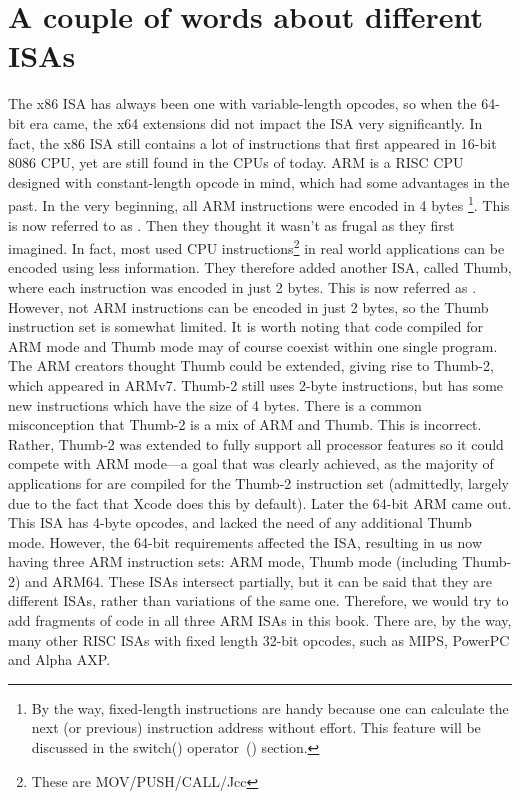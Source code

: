 \ifx\LITE\undefined
{}%
%
%

\section{A couple of words about different \ac{ISA}s}
The x86 \ac{ISA} has always been one with variable-length opcodes, so when the 64-bit era came, the x64 extensions did not impact the \ac{ISA} very significantly. In fact, the x86 \ac{ISA} still contains a lot of instructions that first appeared in 16-bit 8086 CPU, yet are still found in the CPUs of today.
ARM is a \ac{RISC} \ac{CPU} designed with constant-length opcode in mind, which had some advantages in the past.
In the very beginning, all ARM instructions were encoded in 4 bytes%
\footnote{
By the way, fixed-length instructions are handy because one can calculate the next (or previous) 
instruction address without effort. This feature will be discussed in the switch() operator~() section.
}.
This is now referred to as .
Then they thought it wasn't as frugal as they first imagined.
In fact, most used \ac{CPU} instructions\footnote{These are MOV/PUSH/CALL/Jcc} in real world applications can be encoded using less information.
They therefore added another \ac{ISA}, called Thumb, where each instruction was encoded in just 2 bytes.
This is now referred as .
However, not  ARM instructions can be encoded in just 2 bytes, so the Thumb instruction set is somewhat limited.
It is worth noting that code compiled for ARM mode and Thumb mode may of course coexist within one single program.
The ARM creators thought Thumb could be extended, giving rise to Thumb-2, which appeared in ARMv7.
Thumb-2 still uses 2-byte instructions, but has some new instructions which have the size of 4 bytes.
There is a common misconception that Thumb-2 is a mix of ARM and Thumb. This is incorrect. 
Rather, Thumb-2 was extended to fully support all processor features so it could
compete with ARM mode---a goal that was clearly achieved, as the majority of applications for \idevices are compiled for the Thumb-2 instruction set (admittedly, largely due to the fact that Xcode does this by default).
Later the 64-bit ARM came out. This \ac{ISA} has 4-byte opcodes, and lacked the need of any additional Thumb mode.
However, the 64-bit requirements affected the \ac{ISA}, resulting in us now having three ARM instruction sets: ARM mode, Thumb mode (including Thumb-2) and ARM64.
These \ac{ISA}s intersect partially, but it can be said that they are different \ac{ISA}s, rather than variations of the same one.
Therefore, we would try to add fragments of code in all three ARM \ac{ISA}s in this book.
%
%
%
There are, by the way, many other \ac{RISC} \ac{ISA}s with fixed length 32-bit opcodes, such as MIPS, PowerPC and Alpha AXP.
\fi %
\fi %

